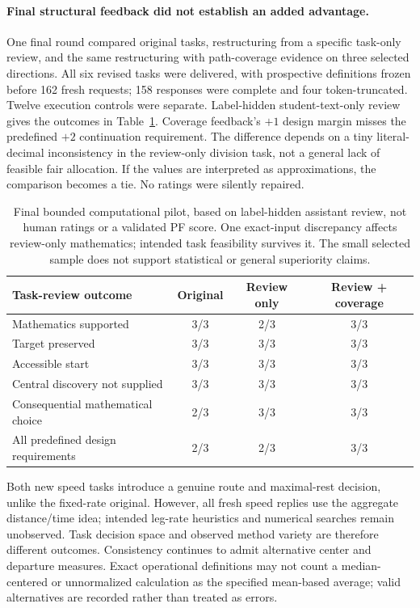 \paragraph{Final structural feedback did not establish an added advantage.}
One final round compared original tasks, restructuring from a specific task-only review, and the same restructuring with path-coverage evidence on three selected directions. All six revised tasks were delivered, with prospective definitions frozen before 162 fresh requests; 158 responses were complete and four token-truncated. Twelve execution controls were separate. Label-hidden student-text-only review gives the outcomes in Table~\ref{tab:final-path-feedback}. Coverage feedback's $+1$ design margin misses the predefined $+2$ continuation requirement. The difference depends on a tiny literal-decimal inconsistency in the review-only division task, not a general lack of feasible fair allocation. If the values are interpreted as approximations, the comparison becomes a tie. No ratings were silently repaired.

\begin{table}[h]
\centering
\small
\begin{tabular}{@{}p{5.6cm}ccc@{}}
\toprule
\textbf{Task-review outcome} & \textbf{Original} & \textbf{Review only} & \textbf{Review + coverage} \\
\midrule
Mathematics supported & 3/3 & 2/3 & 3/3 \\
Target preserved & 3/3 & 3/3 & 3/3 \\
Accessible start & 3/3 & 3/3 & 3/3 \\
Central discovery not supplied & 3/3 & 3/3 & 3/3 \\
Consequential mathematical choice & 2/3 & 3/3 & 3/3 \\
All predefined design requirements & 2/3 & 2/3 & 3/3 \\
\bottomrule
\end{tabular}
\caption{Final bounded computational pilot, based on label-hidden assistant review, not human ratings or a validated PF score. One exact-input discrepancy affects review-only mathematics; intended task feasibility survives it. The small selected sample does not support statistical or general superiority claims.}
\label{tab:final-path-feedback}
\end{table}

Both new speed tasks introduce a genuine route and maximal-rest decision, unlike the fixed-rate original. However, all fresh speed replies use the aggregate distance/time idea; intended leg-rate heuristics and numerical searches remain unobserved. Task decision space and observed method variety are therefore different outcomes. Consistency continues to admit alternative center and departure measures. Exact operational definitions may not count a median-centered or unnormalized calculation as the specified mean-based average; valid alternatives are recorded rather than treated as errors.

